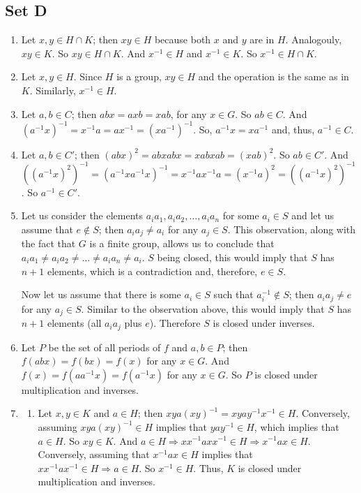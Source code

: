 \documentclass{article}
\begin{document}
\subsection{Set D}
\begin{enumerate}
    \item Let $x, y \in H \cap K$; then $xy \in H$ because both $x$ and $y$ are in $H$. Analogouly, $xy \in K$. So $xy \in H \cap K$. And $x^{-1} \in H$ and $x^{-1} \in K$. So $x^{-1} \in H \cap K$.
    
    \item Let $x, y \in H$. Since $H$ is a group, $xy \in H$ and the operation is the same as in $K$. Similarly, $x^{-1} \in H$.
    
    \item Let $a, b \in C$; then $abx = axb = xab$, for any $x \in G$. So $ab \in C$. And $(a^{-1}x)^{-1} = x^{-1}a = ax^{-1} = (xa^{-1})^{-1}$. So, $a^{-1}x = xa^{-1}$ and, thus, $a^{-1} \in C$.
    
    \item Let $a, b \in C'$; then $(abx)^2 = abxabx = xabxab = (xab)^2$. So $ab \in C'$. And $((a^{-1}x)^2)^{-1} = (a^{-1}xa^{-1}x)^{-1} = x^{-1}ax^{-1}a = (x^{-1}a)^2 = ((a^{-1}x)^2)^{-1}$. So $a^{-1} \in C'$.
    
    \item Let us consider the elements $a_ia_1, a_ia_2, \ldots, a_ia_n$ for some $a_i \in S$ and let us assume that $e \notin S$; then $a_ia_j \ne a_i$ for any $a_j \in S$. This observation, along with the fact that $G$ is a finite group, allows us to conclude that $a_ia_1 \ne a_ia_2 \ne \ldots \ne a_ia_n \ne a_i$. $S$ being closed, this would imply that $S$ has $n + 1$ elements, which is a contradiction and, therefore, $e \in S$.

    Now let us assume that there is some $a_i \in S$ such that $a_i^{-1} \notin S$; then $a_ia_j \ne e$ for any $a_j \in S$. Similar to the observation above, this would imply that $S$ has $n + 1$ elements (all $a_ia_j$ plus $e$). Therefore $S$ is closed under inverses.     
    
    \item Let $P$ be the set of all periods of $f$ and $a, b \in P$; then $f(abx) = f(bx) = f(x)$ for any $x \in G$.
    And $f(x) = f(aa^{-1}x) = f(a^{-1}x)$ for any $x \in G$. So $P$ is closed under multiplication and inverses.
    
    \item
        \begin{enumerate}[label=(\alph*)]
            \item Let $x, y \in K$ and $a \in H$; then $xya(xy)^{-1} = xyay^{-1}x^{-1} \in H$. Conversely, assuming $xya(xy)^{-1} \in H$ implies that $yay^{-1} \in H$, which implies that $a \in H$. So $xy \in K$. And $a \in H \Rightarrow xx^{-1}axx^{-1} \in H \Rightarrow x^{-1}ax \in H$. Conversely, assuming that $x^{-1}ax \in H$ implies that $xx^{-1}ax^{-1} \in H \Rightarrow a \in H$. So $x^{-1} \in H$. Thus, $K$ is closed under multiplication and inverses.
            

\end{enumerate}
\end{enumerate}
\end{document}

